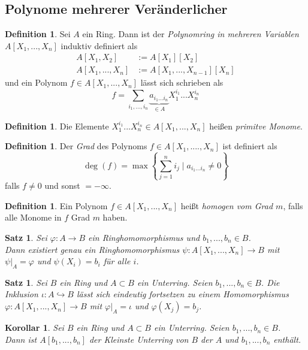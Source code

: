 \documentclass[10pt,a4paper]{article}
\theoremstyle{plain}
\newtheorem{kor}[theorem]{Korollar}
\newtheorem{satz}[theorem]{Satz}
\theoremstyle{definition}
\newtheorem{definition}[theorem]{Definition}
\theoremstyle{remark}
\begin{document}
	\subsection{Polynome mehrerer Veränderlicher}
	\begin{definition}
		Sei $A$ ein Ring. Dann ist der \emph{Polynomring in mehreren Variablen} $A[X_1,...,X_n]$ induktiv definiert als 
		\begin{align*}
		A[X_1,X_2]&:=A[X_1][X_2]\\
		A[X_1,...,X_n]&:=A[X_1,...,X_{n-1}][X_n]
		\end{align*}
		und ein Polynom $f\in A[X_1,...,X_n]$ lässt sich schrieben als
		\[f=\sum_{i_1,...,i_n}\underbrace{a_{i_1...i_n}}_{\in A}X_1^{i_1}...X_n^{i_n}\]
	\end{definition}

	\begin{definition}
		Die Elemente $X_1^{i_1}...X_n^{i_n}\in A[X_1,...,X_n]$ heißen \emph{primitve Monome}.
	\end{definition}

	\begin{definition}
		Der \emph{Grad} des Polynoms $f\in A[X_1,....,X_n]$ ist definiert als
		\[\deg(f)=\max\left\{\sum_{j=1}^{n}i_j\mid a_{i_1...i_n}\neq 0\right\}\]
		falls $f\neq 0$ und sonst $=-\infty$.
	\end{definition}

	\begin{definition}
		Ein Polynom $f\in A[X_1,...,X_n]$ heißt \emph{homogen vom Grad $m$}, falls alle Monome in $f$ Grad $m$ haben.
	\end{definition}

	\begin{satz}
		Sei $\varphi:A\to B$ ein Ringhomomorphismus und $b_1,...,b_n\in B$.\\
		Dann existiert genau ein Ringhomomorphismus $\psi:A[X_1,...,X_n]\to B$ mit $\psi|_A=\varphi$ und $\psi(X_i)=b_i$ für alle $i$.
	\end{satz}

	\begin{satz}
		Sei $B$ ein Ring und $A\subset B$ ein Unterring. Seien $b_1,...,b_n\in B$. Die Inklusion $\iota:A\hookrightarrow B$ lässt sich eindeutig fortsetzen zu einem Homomorphismus $\varphi:A[X_1,...,X_n]\to B$ mit $\varphi|_A=\iota$ und $\varphi(X_j)=b_j$.
	\end{satz}

	\begin{kor}
		Sei $B$ ein Ring und $A\subset B$ ein Unterring. Seien $b_1,...,b_n\in B$.\\
		Dann ist $A[b_1,...,b_n]$ der Kleinste Unterring von $B$ der $A$ und $b_1,...,b_n$ enthält.
	\end{kor}
\end{document}
